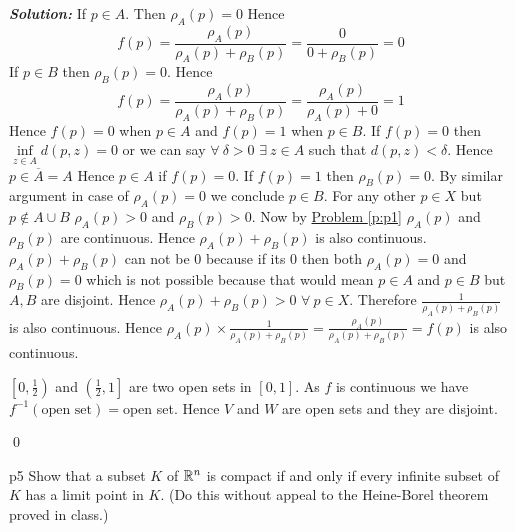 \documentclass[a4paper, 11pt]{article}
\newcommand{\Qed}{\begin{flushright}\qed\end{flushright}}
\newcommand{\sol}[1]{\begin{solution}#1\end{solution}\Qed}
\newenvironment{solution}
{\textbf{\textit{Solution:}}\setlength{\parindent}{1cm}}
{}
\begin{document}
	\sol{
	If $p\in A$. Then $\rho_A(p)=0$ Hence $$f(p)=\dfrac{\rho_{A}(p)}{\rho_{A}(p)+\rho_{B}(p)}=\frac{0}{0+\rho_{B}(p)}=0$$If $p\in B$ then $\rho_{B}(p)=0$. Hence $$f(p)=\dfrac{\rho_{A}(p)}{\rho_{A}(p)+\rho_{B}(p)}=\frac{\rho_{A}(p)}{\rho_{A}(p)+0}=1$$Hence $f(p)=0$ when $p\in A$ and $f(p)=1$ when $p\in B$. If $f(p)=0$ then $\inf\limits_{z\in A}d(p,z)=0$ or we can say $\forall\ \delta>0$ $\exists \ z\in A$ such that $d(p,z)<\delta$. Hence $p\in \overline{A}=A$ Hence $p\in A$ if $f(p)=0$. If $f(p)=1$ then $\rho_B(p)=0$. By similar argument in case of $\rho_A(p)=0$ we conclude $p\in B$. For any other $p\in X$ but $p\notin A\cup B$ $\rho_{A}(p)> 0$ and $\rho_B(p)> 0$. Now by \hyperref[p:p1]{Problem \ref{p:p1}}  $\rho_A(p)$ and $\rho_B(p)$ are continuous. Hence $\rho_A(p)+\rho_B(p)$ is also continuous. $\rho_A(p)+\rho_B(p)$ can not be 0 because if its 0 then both $\rho_A(p)=0$ and $\rho_B(p)=0$ which is not possible because that would mean $p\in A$ and $p\in B$ but $A,B$ are disjoint. Hence $\rho_A(p)+\rho_B(p)>0$ $\forall\ p\in X$. Therefore $\frac1{\rho_A(p)+\rho_B(p)}$ is also continuous. Hence $\rho_A(p)\times \frac1{\rho_A(p)+\rho_B(p)}=\frac{\rho_A(p)}{\rho_A(p)+\rho_B(p)}=f(p)$ is also continuous.
	
	$\left[\left.0,\frac12\right)\right.$ and $\left(\left.\frac12,1 \right]\right.$ are two open sets in $[0,1]$. As $f$ is continuous we have $f^{-1}(\text{open set})=$open set. Hence $V$ and $W$ are open sets and they are disjoint.
}
	
	
	
	\begin{problem}{}{p5}
		Show that a subset $K$ of $\mathbb{R}^n$ is compact if and only if every infinite subset of $K$ has a limit point in $K$. (Do this without appeal to the Heine-Borel theorem proved in class.)
	\end{problem}
	
\end{document}
